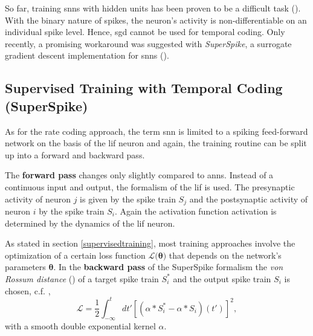 So far, training \glspl{snn} with hidden units has been proven to be a difficult task (\citealp{pfeiffer2018deep}). With the binary nature of spikes, the neuron's activity is non-differentiable on an individual spike level. Hence, \gls{sgd} cannot be used for temporal coding. Only recently, a promising workaround was suggested with \emph{SuperSpike}, a surrogate gradient descent implementation for \glspl{snn} (\citealp{zenke2018superspike}).

\subsection{Supervised Training with Temporal Coding (SuperSpike)}
\label{superspike}

As for the rate coding approach, the term \gls{snn} is limited to a spiking feed-forward network on the basis of the \gls{lif} neuron and again, the training routine can be split up into a forward and backward pass.

The \textbf{forward pass} changes only slightly compared to \glspl{ann}. Instead of a continuous input and output, the formalism of the \gls{lif} is used. The presynaptic activity of neuron $j$ is given by the spike train $S_j$ and the postsynaptic activity of neuron $i$ by the spike train $S_i$. Again the activation function \gls{activation} is determined by the dynamics of the \gls{lif} neuron.

As stated in section \ref{supervisedtraining}, most training approaches involve the optimization of a certain loss function $\mathcal{L(\mathbf{\theta)}}$ that depends on the network's parameters $\mathbf{\theta}$. In the \textbf{backward pass} of the SuperSpike formalism the \emph{von Rossum distance} (\citealp{rossum01novel}) of a target spike train $S^*_i$ and the output spike train $S_i$ is chosen, c.f. \citealp{zenke2018superspike},
\begin{equation}
\label{vonrossumdistance}
\mathcal{L} = \frac{1}{2} \int^t_{-\infty}dt' \left[\left(\alpha \ast S^*_i - \alpha \ast S_i \right)(t')\right]^2,
\end{equation}
with a smooth double exponential kernel $\alpha$. 

